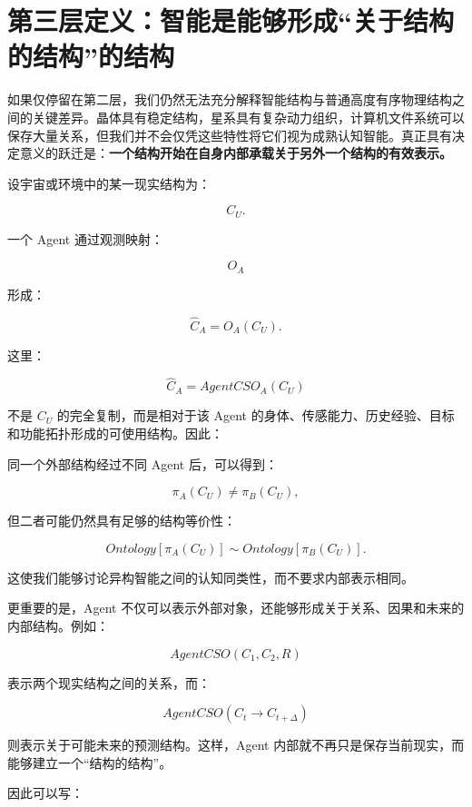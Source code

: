 \section{第三层定义：智能是能够形成“关于结构的结构”的结构}

如果仅停留在第二层，我们仍然无法充分解释智能结构与普通高度有序物理结构之间的关键差异。晶体具有稳定结构，星系具有复杂动力组织，计算机文件系统可以保存大量关系，但我们并不会仅凭这些特性将它们视为成熟认知智能。真正具有决定意义的跃迁是：\textbf{一个结构开始在自身内部承载关于另外一个结构的有效表示。}

设宇宙或环境中的某一现实结构为：

\[
C_U.
\]

一个 Agent 通过观测映射：

\[
O_A
\]

形成：

\[
\hat C_A
=
O_A(C_U).
\]

这里：

\[
\hat C_A
=
AgentCSO_A(C_U)
\]

不是 \(C_U\) 的完全复制，而是相对于该 Agent 的身体、传感能力、历史经验、目标和功能拓扑形成的可使用结构。因此：

\begin{statementbox}
\centering
{}
\end{statementbox}

同一个外部结构经过不同 Agent 后，可以得到：

\[
\pi_A(C_U)
\neq
\pi_B(C_U),
\]

但二者可能仍然具有足够的结构等价性：

\[
Ontology[
\pi_A(C_U)
]
\sim
Ontology[
\pi_B(C_U)
].
\]

这使我们能够讨论异构智能之间的认知同类性，而不要求内部表示相同。

更重要的是，Agent 不仅可以表示外部对象，还能够形成关于关系、因果和未来的内部结构。例如：

\[
AgentCSO(C_1,C_2,R)
\]

表示两个现实结构之间的关系，而：

\[
AgentCSO(
C_t
\rightarrow
C_{t+\Delta}
)
\]

则表示关于可能未来的预测结构。这样，Agent 内部就不再只是保存当前现实，而能够建立一个“结构的结构”。

因此可以写：

\begin{statementbox}
\centering
{}
\end{statementbox}

